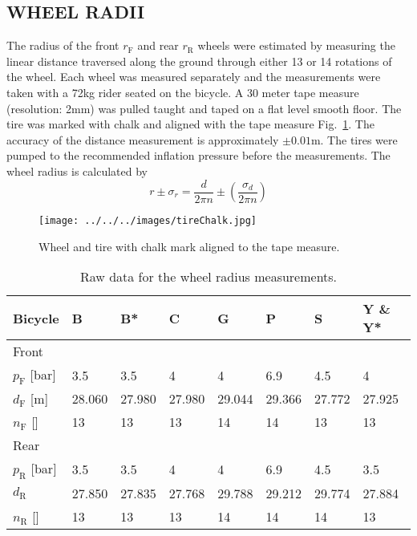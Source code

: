 \documentclass{bmd2010p}
\begin{document}
\subsection{WHEEL RADII}
The radius of the front $r_\mathrm{F}$ and rear $r_\mathrm{R}$ wheels were
estimated by measuring the linear distance traversed along the ground through
either 13 or 14 rotations of the wheel. Each wheel was measured separately and
the measurements were taken with a 72kg rider seated on the bicycle. A 30 meter
tape measure (resolution: 2mm) was pulled taught and taped on a flat level smooth floor. The tire
was marked with chalk and aligned with the tape measure
Fig.~\ref{fig:tireChalk}. The accuracy of the
distance measurement is approximately $\pm0.01$m. The tires were pumped to the
recommended inflation pressure before the measurements. The wheel radius is
calculated by
\begin{equation}
	r\pm\sigma_r=
    \frac{d}{2\pi n}
    \pm\left(\frac{\sigma_d}{2\pi n}\right)
	\label{eq:wheelRadius}
\end{equation}
\begin{figure}[tb]
	\begin{center}
		\texttt{[image: ../../../images/tireChalk.jpg]}
	\end{center}
	\caption{Wheel and tire with chalk mark aligned to the tape measure.}
	\label{fig:tireChalk}
\end{figure}
\begin{table}
    \centering
	\begin{tabular}{llllllll}
	Bicycle   & B      & B*     & C      & G      & P      & S      & Y \& Y*\\
    \hline
	Front\\
    \hline
    $p_\mathrm{F}$ [bar] & 3.5    & 3.5    & 4      & 4      & 6.9    & 4.5    & 4      \\
    $d_\mathrm{F}$ [m]   & 28.060 & 27.980 & 27.980 & 29.044 & 29.366 & 27.772 & 27.925 \\
    $n_\mathrm{F}$ []    & 13     & 13     & 13     & 14     & 14     & 13     & 13     \\
    \hline
	Rear\\
    \hline
	$p_\mathrm{R}$ [bar] & 3.5    & 3.5    & 4      & 4      & 6.9    & 4.5    & 3.5    \\
	$d_\mathrm{R}$       & 27.850 & 27.835 & 27.768 & 29.788 & 29.212 & 29.774 & 27.884 \\
	$n_\mathrm{R}$ []    & 13     & 13     & 13     & 14     & 14     & 14     & 13     \\
	\end{tabular}
	\caption{Raw data for the wheel radius measurements.}
	\label{tab:wheelRadius}
\end{table}
\end{document}
